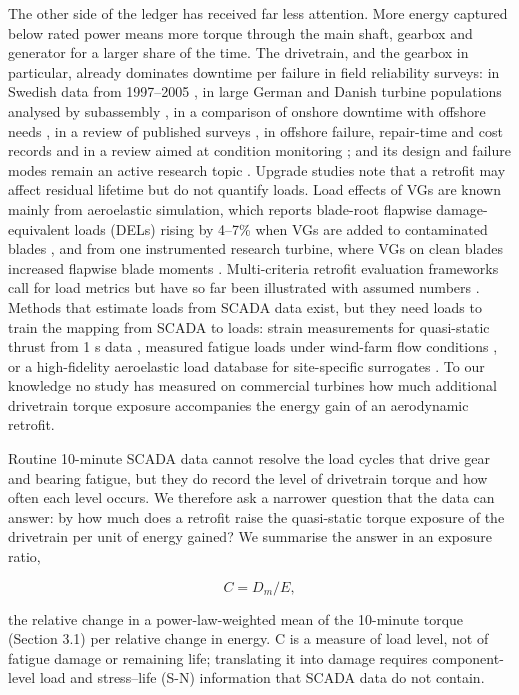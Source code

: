 \documentclass[preprint,12pt]{elsarticle}
\begin{document}
The other side of the ledger has received far less attention. More energy captured below rated power means more torque through the main shaft, gearbox and generator for a larger share of the time. The drivetrain, and the gearbox in particular, already dominates downtime per failure in field reliability surveys: in Swedish data from 1997--2005 \cite{ribrant}, in large German and Danish turbine populations analysed by subassembly \cite{tavner07,spinato}, in a comparison of onshore downtime with offshore needs \cite{faulstich11}, in a review of published surveys \cite{pinar}, in offshore failure, repair-time and cost records \cite{carroll16} and in a review aimed at condition monitoring \cite{artigao}; and its design and failure modes remain an active research topic \cite{nejad22}. Upgrade studies note that a retrofit may affect residual lifetime \cite{astolfi19} but do not quantify loads. Load effects of VGs are known mainly from aeroelastic simulation, which reports blade-root flapwise damage-equivalent loads (DELs) rising by 4--7\% when VGs are added to contaminated blades \cite{kim}, and from one instrumented research turbine, where VGs on clean blades increased flapwise blade moments \cite{bak}. Multi-criteria retrofit evaluation frameworks call for load metrics but have so far been illustrated with assumed numbers \cite{ji}. Methods that estimate loads from SCADA data exist, but they need loads to train the mapping from SCADA to loads: strain measurements for quasi-static thrust from 1 s data \cite{noppe18}, measured fatigue loads under wind-farm flow conditions \cite{veratudela17}, or a high-fidelity aeroelastic load database for site-specific surrogates \cite{dimitrov18}. To our knowledge no study has measured on commercial turbines how much additional drivetrain torque exposure accompanies the energy gain of an aerodynamic retrofit.

Routine 10-minute SCADA data cannot resolve the load cycles that drive gear and bearing fatigue, but they do record the level of drivetrain torque and how often each level occurs. We therefore ask a narrower question that the data can answer: by how much does a retrofit raise the quasi-static torque exposure of the drivetrain per unit of energy gained? We summarise the answer in an exposure ratio,

\begin{equation}
C = D_{m} / E ,
\label{eq:C}
\end{equation}

the relative change in a power-law-weighted mean of the 10-minute torque (Section 3.1) per relative change in energy. C is a measure of load level, not of fatigue damage or remaining life; translating it into damage requires component-level load and stress--life (S-N) information that SCADA data do not contain.
\end{document}
